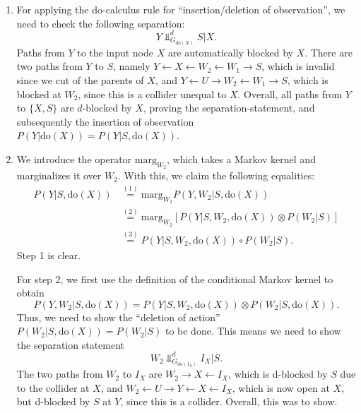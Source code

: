     \begin{gradedsolution}
      \begin{enumerate}
	\item For applying the do-calculus rule for ``insertion/deletion of observation'', we need to check the following separation:
	  \begin{equation*}
	    Y \Perp_{G_{\text{do}(X)}}^{d} S | X.
	  \end{equation*}
	  Paths from $Y$ to the input node $X$ are automatically blocked by $X$.
	  There are two paths from $Y$ to $S$, namely $Y \leftarrow X \leftarrow W_2 \leftarrow W_1 \rightarrow S$, which is invalid since we cut of the parents of $X$, and $Y \leftarrow U \rightarrow W_2 \leftarrow W_1 \rightarrow S$, which is blocked at $W_2$, since this is a collider unequal to $X$.
	  Overall, all paths from $Y$ to $\{X, S\}$ are $d$-blocked by $X$, proving the separation-statement, and subsequently the insertion of observation $P(Y | \text{do}(X)) = P(Y | S, \text{do}(X))$.
	\item We introduce the operator $\text{marg}_{W_2}$, which takes a Markov kernel and marginalizes it over $W_2$.
	  With this, we claim the following equalities:
	  \begin{align*}
	    P(Y | S, \text{do}(X)) & \overset{(1)} = \text{marg}_{W_2} P(Y, W_2 | S, \text{do}(X)) \\
	    & \overset{(2)} = \text{marg}_{W_2}  \left[ P(Y | S, W_2, \text{do}(X)) \otimes P(W_2 | S) \right] \\
	    & \overset{(3)} = P(Y | S, W_2, \text{do}(X)) \circ P(W_2 | S).
	  \end{align*}
	  Step 1 is clear.

	  For step 2, we first use the definition of the conditional Markov kernel to obtain
	  \begin{equation*}
	    P(Y, W_2 | S, \text{do}(X)) = P(Y | S, W_2, \text{do}(X)) \otimes P(W_2 | S, \text{do}(X)).
	  \end{equation*}
	  Thus, we need to show the ``deletion of action'' $P(W_2 | S, \text{do}(X)) = P(W_2 | S)$ to be done.
	  This means we need to show the separation statement
	  \begin{equation*}
	    W_2 \Perp_{G_{\text{do}(I_X)}}^d I_X | S.
	  \end{equation*}
	  The two paths from $W_2$ to $I_X$ are $W_2 \rightarrow X \leftarrow I_X$, which is d-blocked by $S$ due to the collider at $X$, and $W_2 \leftarrow U \rightarrow Y \leftarrow X \leftarrow I_X$, which is now open at $X$, but d-blocked by $S$ at $Y$, since this is a collider.
	  Overall, this was to show.


\end{enumerate}
\end{gradedsolution}

